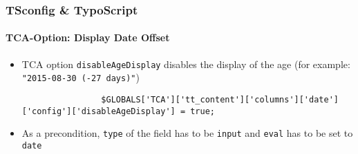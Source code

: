 \begin{frame}[fragile]
	\frametitle{TSconfig \& TypoScript}
	\framesubtitle{TCA-Option: Display Date Offset}

	\lstset{basicstyle=\tiny\ttfamily}

	\begin{itemize}

		\item TCA option \texttt{disableAgeDisplay} disables the display of the age\newline
			\small
				(for example: \texttt{"2015-08-30 (-27 days)"})
			\normalsize

			\begin{lstlisting}
				$GLOBALS['TCA']['tt_content']['columns']['date']['config']['disableAgeDisplay'] = true;
			\end{lstlisting}

		\item As a precondition, \texttt{type} of the field has to be \texttt{input}
			and \texttt{eval} has to be set to \texttt{date}

	\end{itemize}

\end{frame}


